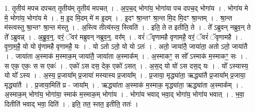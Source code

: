 \documentclass[17pt]{extarticle}
\begin{document}
1. तृ॒तीय॑ मपच दपचत् तृ॒तीय॑म् तृ॒तीय॑ मपचत् । . अ॒प॒च॒द् भोगा॑य॒ भोगा॑या पच दपच॒द् भोगा॑य । . भोगा॑य मे मे॒ भोगा॑य॒ भोगा॑य मे । . म॒ इ॒द मि॒दम् मे॑ म इ॒दम् । . इ॒दꣳ श्रा॒न्तꣳ श्रा॒न्त मि॒द मि॒दꣳ श्रा॒न्तम् । . श्रा॒न्त म॑स्त्वस्तु श्रा॒न्तꣳ श्रा॒न्त म॑स्तु । . अ॒स्त्वि तीत्य॑स्त्व॒ स्त्विति॑ । . इति॒ ते त इतीति॒ ते । . ते᳚ ऽब्रुवन् नब्रुव॒न् ते ते᳚ ऽब्रुवन्न् । . अ॒ब्रु॒व॒न्॒. वरं॒ ॅवर॑ मब्रुवन् नब्रुव॒न्॒. वर᳚म् । . वरं॑ ॅवृणामहै वृणामहै॒ वरं॒ ॅवरं॑ ॅवृणामहै । . वृ॒णा॒म॒है॒ यो यो वृ॑णामहै वृणामहै॒ यः । . यो ऽतो ऽतो॒ यो यो ऽतः॑ । . अतो॒ जाया॑तै॒ जाया॑ता॒ अतो ऽतो॒ जाया॑तै । . जाया॑ता अ॒स्माक॑ म॒स्माक॒म् जाया॑तै॒ जाया॑ता अ॒स्माक᳚म् । . अ॒स्माकꣳ॒॒ स सो᳚ ऽस्माक॑ म॒स्माकꣳ॒॒ सः । . स एक॒ एकः॒ स स एकः॑ । . एको॑ ऽस दस॒ देक॒ एको॑ ऽसत् । . अ॒स॒द् यो यो॑ ऽस दस॒द् यः । . यो᳚ ऽस्यास्य॒ यो यो᳚ ऽस्य । . अ॒स्य॒ प्र॒जाया᳚म् प्र॒जाया॑ मस्यास्य प्र॒जाया᳚म् । . प्र॒जाया॒ मृद्ध्या॑ता॒ ऋद्ध्या॑तै प्र॒जाया᳚म् प्र॒जाया॒ मृद्ध्या॑तै । . प्र॒जाया॒मिति॑ प्र - जाया᳚म् । . ऋद्ध्या॑ता अ॒स्माक॑ म॒स्माक॒ मृद्ध्या॑ता॒ ऋद्ध्या॑ता अ॒स्माक᳚म् । . अ॒स्माक॒म् भोगा॑य॒ भोगा॑या॒ स्माक॑ म॒स्माक॒म् भोगा॑य । . भोगा॑य भवाद् भवा॒द् भोगा॑य॒ भोगा॑य भवात् । . भ॒वा॒ दितीति॑ भवाद् भवा॒ दिति॑ । . इति॒ तत॒ स्तत॒ इतीति॒ ततः॑ । \newline
\end{document}
